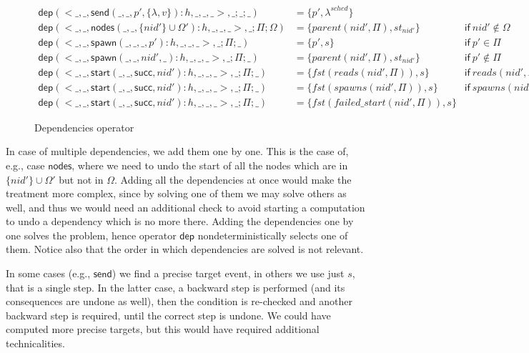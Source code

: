 \documentclass[runningheads]{llncs}
\newcommand{\ms}[1]{\mathsf{#1}}
\newcommand{\nill}{[\:]}
\begin{document}
\begin{figure}[t]
  \hspace{-2cm}
  $
  \begin{array}{lll}
    \ms{dep}(<\_,\_,\ms{send}(\_,\_,p',\{\lambda,v\}):h,\_,\_,\_>,\_;\_;\_) &=\{p',\lambda^{sched}\}&\\
    \ms{dep}(<\_,\_,\ms{nodes}(\_,\_,\{nid'\}\cup\Omega'):h,\_,\_,\_>,\_;\Pi;\Omega)&= \{parent(nid',\Pi),st_{nid'}\}&\ms{if}~nid'\notin\Omega\\
    \ms{dep}(<\_,\_,\ms{spawn}(\_,\_,\_,p'):h,\_,\_,\_>,\_;\Pi;\_) & =\{p',s\}&\ms{if}~p'\in\Pi\\
    \ms{dep}(<\_,\_,\ms{spawn}(\_,\_,nid',\_):h,\_,\_,\_>,\_;\Pi;\_) & =\{parent(nid',\Pi),st_{nid'}\}&\ms{if}~p'\notin\Pi\\
    \ms{dep}(<\_,\_,\ms{start}(\_,\_,\ms{succ},nid'):h,\_,\_,\_>,\_;\Pi;\_)&=\{fst(reads(nid',\Pi)),s\}&\ms{if}~reads(nid',\Pi)\not=\nill\\
    \ms{dep}(<\_,\_,\ms{start}(\_,\_,\ms{succ},nid'):h,\_,\_,\_>,\_;\Pi;\_)&=\{fst(spawns(nid',\Pi)),s\}&\ms{if}~spawns(nid',\Pi)\not=\nill\\
    \ms{dep}(<\_,\_,\ms{start}(\_,\_,\ms{succ},nid'):h,\_,\_,\_>,\_;\Pi;\_)&= \{fst(failed\_start(nid',\Pi)),s\}&
  \end{array}
  $
  \caption{Dependencies operator}
\label{fig:dep}
\end{figure}



In case of multiple dependencies, we add them one by one. This is the case
of, e.g., case $\ms{nodes}$, where we need to undo the start of all the
nodes which are in $\{nid'\}\cup\Omega'$ but not in $\Omega$. Adding all the
dependencies at once would make the treatment more complex, since by
solving one of them we may solve others as well, and thus we would
need an additional check to avoid starting a computation to undo a
dependency which is no more there. Adding the dependencies one by one
solves the problem, hence operator $\ms{dep}$ nondeterministically
selects one of them. Notice also that the order in which dependencies
are solved is not relevant.

In some cases (e.g., $\ms{send}$) we find a precise target event, in others
we use just $s$, that is a single step. In the latter case, a backward
step is performed (and its consequences are undone as well), then the
condition is re-checked and another backward step is required, until
the correct step is undone. We could have computed more precise
targets, but this would have required additional technicalities.
\end{document}

